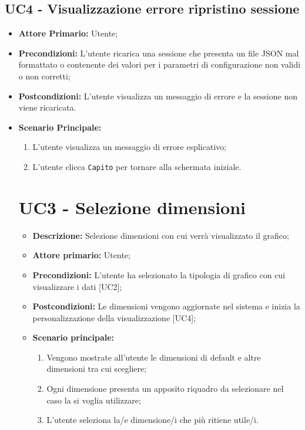 \subsection{UC4 - Visualizzazione errore ripristino sessione}
\begin{itemize}
  \item \textbf{Attore Primario:} Utente;
  \item \textbf{Precondizioni:} L'utente ricarica una sessione che presenta un file JSON mal formattato o contenente dei valori per i parametri di configurazione non validi o non corretti;
  \item \textbf{Postcondizioni:} L'utente visualizza un messaggio di errore e la sessione non viene ricaricata.
  \item \textbf{Scenario Principale:}
  \begin{enumerate}
    \item L'utente visualizza un messaggio di errore esplicativo;
    \item L'utente clicca \texttt{Capito} per tornare alla schermata iniziale.
  \end{enumerate}

\section{UC3 - Selezione dimensioni}
 \begin{itemize}
     \item \textbf{Descrizione:} Selezione dimensioni con cui verrà visualizzato il grafico;
     \item \textbf{Attore primario:} Utente;
     \item \textbf{Precondizioni:} L'utente ha selezionato la tipologia di grafico con cui visualizzare i dati [UC2];
     \item \textbf{Postcondizioni:} Le dimensioni vengono aggiornate nel sistema e inizia la personalizzazione della visualizzazione [UC4];
     \item \textbf{Scenario principale:}
     \begin{enumerate}
         \item Vengono mostrate all'utente le dimensioni di default e altre dimensioni tra cui scegliere;
         \item Ogni dimensione presenta un apposito riquadro da selezionare nel caso la si voglia utilizzare;
         \item L'utente seleziona la/e dimensione/i che più ritiene utile/i.
     \end{enumerate}
 \end{itemize}


\end{itemize}
